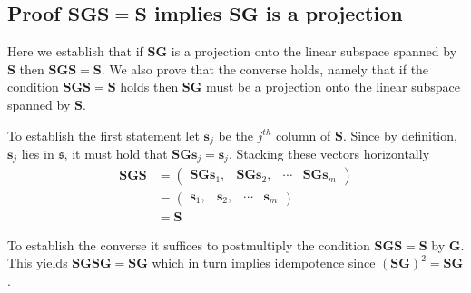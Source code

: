 \documentclass[12pt]{article}
\theoremstyle{definition}
\begin{document}
	\subsection{Proof $\bm{S}\bm{G}\bm{S}=\bm{S}$ implies $\bm{S}\bm{G}$ is a projection} \label{app:projection-proof}
	Here we establish that if $\bm{S}\bm{G}$ is a projection onto the linear subspace spanned by $\bm{S}$ then $\bm{S}\bm{G}\bm{S}=\bm{S}$.  We also prove that the converse holds, namely that if the condition $\bm{S}\bm{G}\bm{S}=\bm{S}$ holds then $\bm{S}\bm{G}$ must be a projection onto the linear subspace spanned by $\bm{S}$.
	
	To establish the first statement let $\bm{s}_j$ be the $j^{th}$ column of $\bm{S}$.  Since by definition, $\bm{s}_j$ lies in $\mathfrak{s}$, it must hold that $\bm{S}\bm{G}\bm{s}_j=\bm{s}_j$.  Stacking these vectors horizontally
	\begin{align*}
	\bm{S}\bm{G}\bm{S}&=\begin{pmatrix}
	\bm{S}\bm{G}\bm{s}_1, & \bm{S}\bm{G}\bm{s}_2, & \cdots & \bm{S}\bm{G}\bm{s}_m
	\end{pmatrix}\\
	&=\begin{pmatrix}
	\bm{s}_1, & \bm{s}_2, & \cdots & \bm{s}_m
	\end{pmatrix}\\
	&=\bm{S}
	\end{align*}
	
	To establish the converse it suffices to postmultiply the condition $\bm{S}\bm{G}\bm{S}=\bm{S}$ by $\bm{G}$.  This yields $\bm{S}\bm{G}\bm{S}\bm{G}=\bm{S}\bm{G}$ which in turn implies idempotence since $(\bm{S}\bm{G})^2=\bm{S}\bm{G}$.
	
	
	
	\newpage
	

	
	
	
	
	
\end{document}

